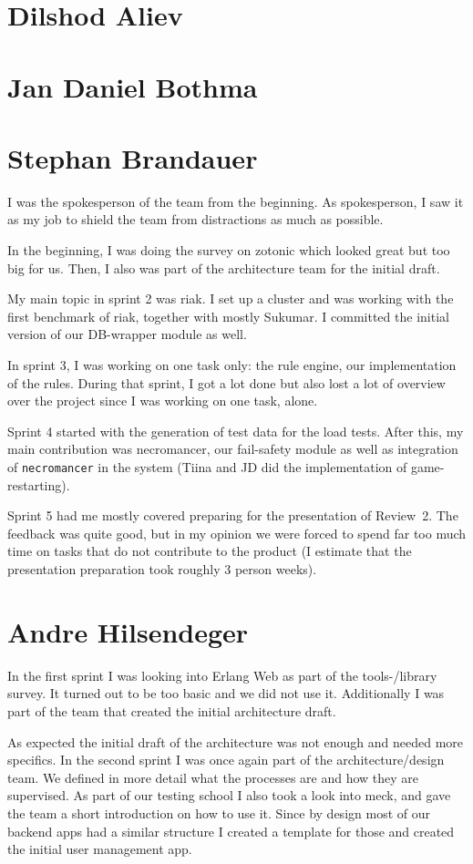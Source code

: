 \documentclass[11pt,a4paper]{report}
\begin{document}
\section{Dilshod Aliev}
\section{Jan Daniel Bothma}
\section{Stephan Brandauer}
I was the spokesperson of the team from the beginning. As spokesperson,
I saw it as my job to shield the team from distractions as much as possible.

In the beginning, I was doing the survey on zotonic which looked great but too
big for us. Then, I also was part of the architecture team for the initial
draft.

My main topic in sprint 2 was riak. I set up a cluster and was working with the
first benchmark of riak, together with mostly Sukumar.
I committed the initial version of our DB-wrapper module as well.

In sprint 3, I was working on one task only: the rule engine, our implementation
of the rules. During that sprint, I got a lot done but also lost a lot of
overview over the project since I was working on one task, alone.

Sprint 4 started with the generation of test data for the load tests. After
this, my main contribution was necromancer, our fail-safety module as well as
integration of {\tt necromancer} in the system (Tiina and JD did the
implementation of game-restarting).

Sprint 5 had me mostly covered preparing for the presentation of Review~2.
The feedback was quite good, but in my opinion we were forced to spend far too
much time on tasks that do not contribute to the product (I estimate that the
presentation preparation took roughly 3 person weeks).

\section{Andre Hilsendeger}
In the first sprint I was looking into Erlang Web as part of the tools-/library survey.
It turned out to be too basic and we did not use it.
Additionally I was part of the team that created the initial architecture draft.

As expected the initial draft of the architecture was not enough and needed more specifics.
In the second sprint I was once again part of the architecture/design team.
We defined in more detail what the processes are and how they are supervised.
As part of our testing school I also took a look into meck, and gave the team a short introduction
on how to use it.
Since by design most of our backend apps had a similar structure I created a template for those
and created the initial user management app.
\end{document}
